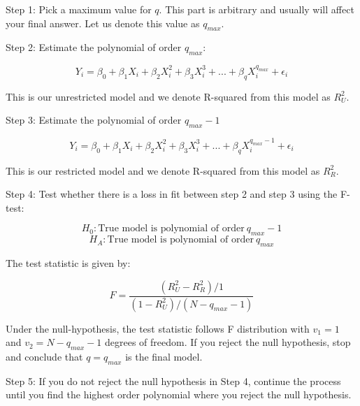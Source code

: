 \documentclass[
]{book}
\theoremstyle{definition}
\theoremstyle{definition}
\theoremstyle{definition}
\theoremstyle{definition}
\theoremstyle{remark}
\begin{document}
Step 1: Pick a maximum value for \(q\). This part is arbitrary and usually will affect your final answer. Let us denote this value as \(q_{max}\).

Step 2: Estimate the polynomial of order \(q_{max}\):

\[Y_i = \beta_0 + \beta_1 X_i + \beta_2 X_i^2 + \beta_3 X_i^3+...+ \beta_q X_i^{q_{max}} + \epsilon_i\]

This is our unrestricted model and we denote R-squared from this model as \(R^2_U\).

Step 3: Estimate the polynomial of order \(q_{max}-1\)

\[Y_i = \beta_0 + \beta_1 X_i + \beta_2 X_i^2 + \beta_3 X_i^3+...+ \beta_q X_i^{q_{max}-1} + \epsilon_i\]

This is our restricted model and we denote R-squared from this model as \(R^2_R\).

Step 4: Test whether there is a loss in fit between step 2 and step 3 using the F-test:

\[H_0: \text{True model is polynomial of order} \ q_{max}-1 \]
\[H_A: \text{True model is polynomial of order} \ q_{max}\]

The test statistic is given by:

\[F=\frac{(R^2_U-R^2_R)/1}{(1-R^2_U)/(N-q_{max}-1)}\]

Under the null-hypothesis, the test statistic follows F distribution with \(v_1=1\) and \(v_2=N-q_{max}-1\) degrees of freedom. If you reject the null hypothesis, stop and conclude that \(q=q_{max}\) is the final model.

Step 5: If you do not reject the null hypothesis in Step 4, continue the process until you find the highest order polynomial where you reject the null hypothesis.
\end{document}
